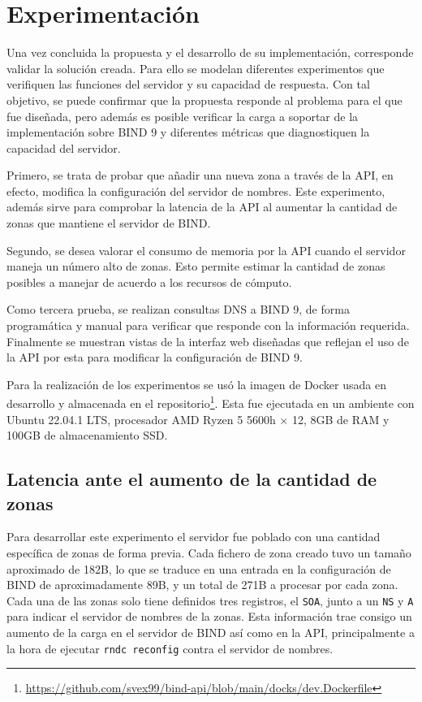\section{Experimentación}

Una vez concluida la propuesta y el desarrollo de su implementación, corresponde validar la solución creada. Para ello se modelan diferentes experimentos que verifiquen las funciones del servidor y su capacidad de respuesta. Con tal objetivo, se puede confirmar que la propuesta responde al problema para el que fue diseñada, pero además es posible verificar la carga a soportar de la implementación sobre BIND 9 y diferentes métricas que diagnostiquen la capacidad del servidor.

Primero, se trata de probar que añadir una nueva zona a través de la API, en efecto, modifica la configuración del servidor de nombres. Este experimento, además sirve para comprobar la latencia de la API al aumentar la cantidad de zonas que mantiene el servidor de BIND.

Segundo, se desea valorar el consumo de memoria por la API cuando el servidor maneja un número alto de zonas. Esto permite estimar la cantidad de zonas posibles a manejar de acuerdo a los recursos de cómputo.

Como tercera prueba, se realizan consultas DNS a BIND 9, de forma programática y manual para verificar que responde con la información requerida. Finalmente se muestran vistas de la interfaz web diseñadas que reflejan el uso de la API por esta para modificar la configuración de BIND 9.

Para la realización de los experimentos se usó la imagen de Docker usada en desarrollo y almacenada en el repositorio\footnote{\url{https://github.com/svex99/bind-api/blob/main/docks/dev.Dockerfile}}. Esta fue ejecutada en un ambiente con Ubuntu 22.04.1 LTS, procesador AMD Ryzen 5 5600h × 12, 8GB de RAM y 100GB de almacenamiento SSD.

\subsection{Latencia ante el aumento de la cantidad de zonas}

Para desarrollar este experimento el servidor fue poblado con una cantidad específica de zonas de forma previa. Cada fichero de zona creado tuvo un tamaño aproximado de 182B, lo que se traduce en una entrada en la configuración de BIND de aproximadamente 89B, y un total de 271B a procesar por cada zona. Cada una de las zonas solo tiene definidos tres registros, el \verb|SOA|, junto a un \verb|NS| y \verb|A| para indicar el servidor de nombres de la zonas. Esta información trae consigo un aumento de la carga en el servidor de BIND así como en la API, principalmente a la hora de ejecutar \verb|rndc reconfig| contra el servidor de nombres.

